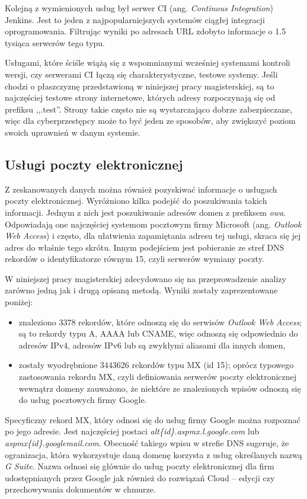 Kolejną z wymienionych usług był serwer CI (ang. \textit{Continous Integration}) Jenkins. Jest to jeden z najpopularniejszych
systemów ciągłej integracji oprogramowania. Filtrując wyniki po adresach URL zdobyto informacje o 1.5 tysiąca serwerów tego typu.

Usługami, które ściśle wiążą się z wspomnianymi wcześniej systemami kontroli wersji, czy serwerami CI łączą się charakterystyczne,
testowe systemy. Jeśli chodzi o płaszczyznę przedstawioną w niniejszej pracy magisterskiej, są to najczęściej testowe strony
internetowe, których adresy rozpoczynają się od prefiksu ,,.test''. Strony takie często nie są wystarczająco dobrze zabezpieczane,
więc dla cyberprzestępcy może to być jeden ze sposobów, aby zwiększyć poziom swoich uprawnień w danym systemie.

\subsection{Usługi poczty elektronicznej}
\noindent Z zeskanowanych danych można również pozyskiwać informacje o usługach poczty elektronicznej. Wyróżniono kilka podejść do
poszukiwania takich informacji. Jednym z nich jest poszukiwanie adresów domen z prefiksem \textit{owa}.
Odpowiadają one najczęściej systemom pocztowym firmy Microsoft (ang. \textit{Outlook Web Access}) i często, dla ułatwienia
zapamiętania adresu tej usługi, skraca się jej adres do właśnie tego skrótu. Innym podejściem jest pobieranie ze stref DNS rekordów
o identyfikatorze równym 15, czyli serwerów wymiany poczty.

W niniejszej pracy magisterskiej zdecydowano się na przeprowadzenie analizy zarówno jedną jak i drugą opisaną metodą. Wyniki zostały
zaprezentowane poniżej:
\begin{itemize}
		\item znaleziono 3378 rekordów, które odnoszą się do serwisów \textit{Outlook Web Access}; są to rekordy typu A, AAAA lub
		CNAME, więc odnoszą się odpowiednio do adresów IPv4, adresów IPv6 lub są zwykłymi aliasami dla innych domen,
		\item zostały wyodrębnione 3443626 rekordów typu MX (id 15); oprócz typowego zastosowania rekordu MX, czyli definiowania
		serwerów poczty elektronicznej wewnątrz domeny zauważono, że niektóre ze znalezionych wpisów odnoszą się do usług pocztowych
		firmy Google.
\end{itemize}

Specyficzny rekord MX, który odnosi się do usług firmy Google można rozpoznać po jego adresie. Jest najczęściej postaci \textit{alt\{id\}.aspmx.l.google.com} lub
\textit{aspmx\{id\}.googlemail.com}. Obecność takiego wpisu w strefie DNS sugeruje, że ogranizacja, która wykorzystuje daną domenę
korzysta z usług określanych nazwą \textit{G Suite}. Nazwa odnosi się głównie do usług poczty elektronicznej dla firm udostępnianych
przez Google jak również do rozwiązań Cloud -- edycji czy przechowywania dokumentów w chmurze.

